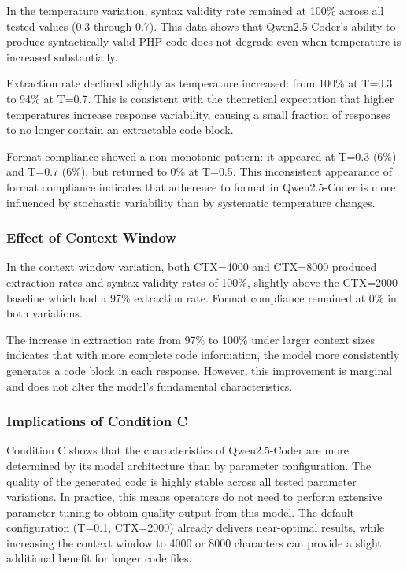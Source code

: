 In the temperature variation, syntax validity rate remained at 100\% across all tested values (0.3 through 0.7). This data shows that Qwen2.5-Coder's ability to produce syntactically valid PHP code does not degrade even when temperature is increased substantially.

Extraction rate declined slightly as temperature increased: from 100\% at T=0.3 to 94\% at T=0.7. This is consistent with the theoretical expectation that higher temperatures increase response variability, causing a small fraction of responses to no longer contain an extractable code block.

Format compliance showed a non-monotonic pattern: it appeared at T=0.3 (6\%) and T=0.7 (6\%), but returned to 0\% at T=0.5. This inconsistent appearance of format compliance indicates that adherence to format in Qwen2.5-Coder is more influenced by stochastic variability than by systematic temperature changes.

\subsubsection{Effect of Context Window}

In the context window variation, both CTX=4000 and CTX=8000 produced extraction rates and syntax validity rates of 100\%, slightly above the CTX=2000 baseline which had a 97\% extraction rate. Format compliance remained at 0\% in both variations.

The increase in extraction rate from 97\% to 100\% under larger context sizes indicates that with more complete code information, the model more consistently generates a code block in each response. However, this improvement is marginal and does not alter the model's fundamental characteristics.

\subsubsection{Implications of Condition C}

Condition C shows that the characteristics of Qwen2.5-Coder are more determined by its model architecture than by parameter configuration. The quality of the generated code is highly stable across all tested parameter variations. In practice, this means operators do not need to perform extensive parameter tuning to obtain quality output from this model. The default configuration (T=0.1, CTX=2000) already delivers near-optimal results, while increasing the context window to 4000 or 8000 characters can provide a slight additional benefit for longer code files.

